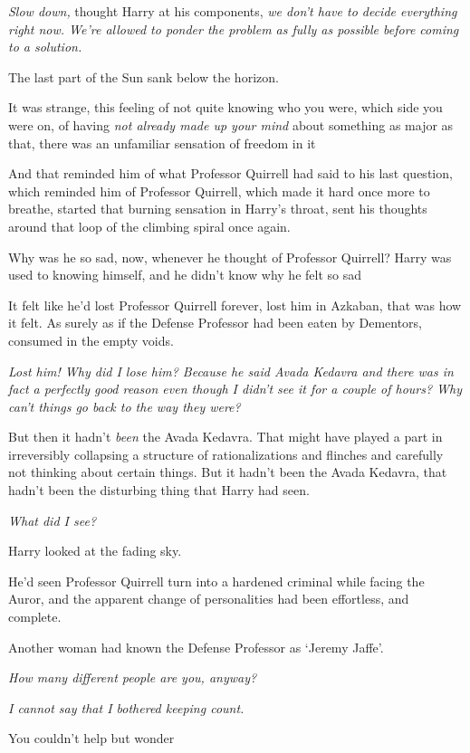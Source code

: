\emph{Slow down,} thought Harry at his components, \emph{we don't have to
decide everything right now. We're allowed to ponder the problem as fully as
possible before coming to a solution.}

The last part of the Sun sank below the horizon.

It was strange, this feeling of not quite knowing who you were, which side you
were on, of having \emph{not already made up your mind} about something as
major as that, there was an unfamiliar sensation of freedom in it{\el}

And that reminded him of what Professor Quirrell had said to his last question,
which reminded him of Professor Quirrell, which made it hard once more to
breathe, started that burning sensation in Harry's throat, sent his thoughts
around that loop of the climbing spiral once again.

Why was he so sad, now, whenever he thought of Professor Quirrell? Harry was
used to knowing himself, and he didn't know why he felt so sad{\el}

It felt like he'd lost Professor Quirrell forever, lost him in Azkaban, that
was how it felt. As surely as if the Defense Professor had been eaten by
Dementors, consumed in the empty voids.

\emph{Lost him! Why did I lose him? Because he said Avada Kedavra and there was
in fact a perfectly good reason even though I didn't see it for a couple of
hours? Why can't things go back to the way they were?}

But then it hadn't \emph{been} the Avada Kedavra. That might have played a part
in irreversibly collapsing a structure of rationalizations and flinches and
carefully not thinking about certain things. But it hadn't been the Avada
Kedavra, that hadn't been the disturbing thing that Harry had seen.

\emph{What did I see{\el}?}

Harry looked at the fading sky.

He'd seen Professor Quirrell turn into a hardened criminal while facing the
Auror, and the apparent change of personalities had been effortless, and
complete.

Another woman had known the Defense Professor as `Jeremy Jaffe'.

\emph{How many different people are you, anyway?}

\emph{I cannot say that I bothered keeping count.}

You couldn't help but wonder{\el}

